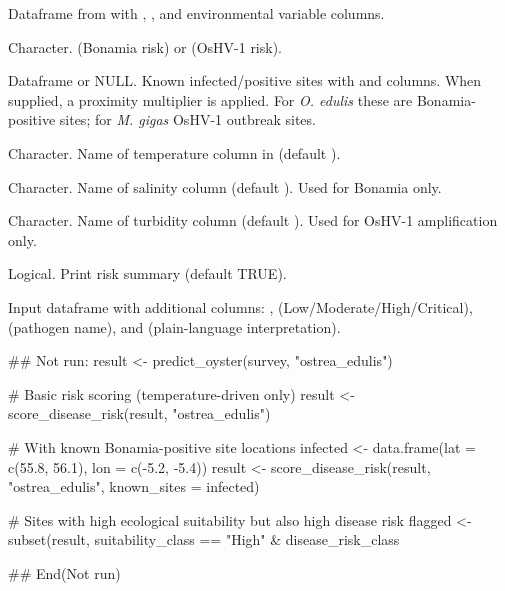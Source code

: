 \documentclass[a4paper]{book}
\begin{document}
\begin{Arguments}
\begin{ldescription}
\item[\code{result}] Dataframe from  with , , and
environmental variable columns.

\item[\code{species}] Character.  (Bonamia risk) or
 (OsHV-1 risk).

\item[\code{known\_sites}] Dataframe or NULL. Known infected/positive sites with
 and  columns. When supplied, a proximity multiplier is applied.
For \emph{O. edulis} these are Bonamia-positive sites; for \emph{M. gigas} OsHV-1
outbreak sites.

\item[\code{temp\_col}] Character. Name of temperature column in 
(default ).

\item[\code{salinity\_col}] Character. Name of salinity column (default ).
Used for Bonamia only.

\item[\code{turbidity\_col}] Character. Name of turbidity column (default
). Used for OsHV-1 amplification only.

\item[\code{verbose}] Logical. Print risk summary (default TRUE).
\end{ldescription}
\end{Arguments}
%
\begin{Value}
Input dataframe with additional columns:
 ,  (Low/Moderate/High/Critical),
 (pathogen name), and  (plain-language
interpretation).
\end{Value}
%
\begin{Examples}
\begin{ExampleCode}
## Not run: 
result <- predict_oyster(survey, "ostrea_edulis")

# Basic risk scoring (temperature-driven only)
result <- score_disease_risk(result, "ostrea_edulis")

# With known Bonamia-positive site locations
infected <- data.frame(lat = c(55.8, 56.1), lon = c(-5.2, -5.4))
result <- score_disease_risk(result, "ostrea_edulis",
                              known_sites = infected)

# Sites with high ecological suitability but also high disease risk
flagged <- subset(result,
  suitability_class == "High" & disease_risk_class %

## End(Not run)
\end{ExampleCode}
\end{Examples}
\end{document}
